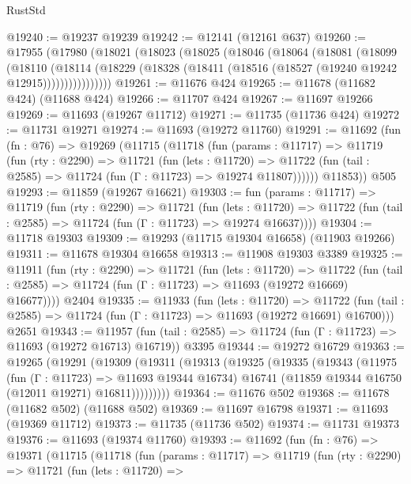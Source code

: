 \begin{lexlean}{RustStd}
\begin{coremodule}
@19240 := @19237 @19239
@19242 := @12141 (@12161 @637)
@19260 := @17955
    (@17980
      (@18021
        (@18023
          (@18025
            (@18046
              (@18064
                (@18081
                  (@18099
                    (@18110
                      (@18114
                        (@18229
                          (@18328 (@18411 (@18516 (@18527 (@19240 @19242 @12915))))))))))))))))
@19261 := @11676 @424
@19265 := @11678 (@11682 @424) (@11688 @424)
@19266 := @11707 @424
@19267 := @11697 @19266
@19269 := @11693 (@19267 @11712)
@19271 := @11735 (@11736 @424)
@19272 := @11731 @19271
@19274 := @11693 (@19272 @11760)
@19291 := @11692
    (fun (fn : @76) =>
    @19269
      (@11715
        (@11718
          (fun (params : @11717) =>
          @11719
            (fun (rty : @2290) =>
            @11721
              (fun (lets : @11720) =>
              @11722 (fun (tail : @2585) => @11724 (fun (Γ : @11723) => @19274 @11807))))))
        @11853))
    @505
@19293 := @11859 (@19267 @16621)
@19303 := fun (params : @11717) =>
  @11719
    (fun (rty : @2290) =>
    @11721
      (fun (lets : @11720) =>
      @11722 (fun (tail : @2585) => @11724 (fun (Γ : @11723) => @19274 @16637))))
@19304 := @11718 @19303
@19309 := @19293 (@11715 @19304 @16658) (@11903 @19266)
@19311 := @11678 @19304 @16658
@19313 := @11908 @19303 @3389
@19325 := @11911
    (fun (rty : @2290) =>
    @11721
      (fun (lets : @11720) =>
      @11722 (fun (tail : @2585) => @11724 (fun (Γ : @11723) => @11693 (@19272 @16669) @16677))))
    @2404
@19335 := @11933
    (fun (lets : @11720) =>
    @11722 (fun (tail : @2585) => @11724 (fun (Γ : @11723) => @11693 (@19272 @16691) @16700)))
    @2651
@19343 := @11957
    (fun (tail : @2585) => @11724 (fun (Γ : @11723) => @11693 (@19272 @16713) @16719))
    @3395
@19344 := @19272 @16729
@19363 := @19265
    (@19291
      (@19309
        (@19311
          (@19313
            (@19325
              (@19335
                (@19343
                  (@11975
                    (fun (Γ : @11723) => @11693 @19344 @16734)
                    @16741
                    (@11859 @19344 @16750 (@12011 @19271) @16811)))))))))
@19364 := @11676 @502
@19368 := @11678 (@11682 @502) (@11688 @502)
@19369 := @11697 @16798
@19371 := @11693 (@19369 @11712)
@19373 := @11735 (@11736 @502)
@19374 := @11731 @19373
@19376 := @11693 (@19374 @11760)
@19393 := @11692
    (fun (fn : @76) =>
    @19371
      (@11715
        (@11718
          (fun (params : @11717) =>
          @11719
            (fun (rty : @2290) =>
            @11721
              (fun (lets : @11720) =>

\end{coremodule}
\end{lexlean}
